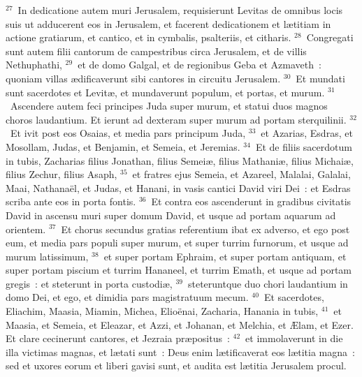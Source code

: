${}^{27}$~In dedicatione autem muri Jerusalem, requisierunt Levitas de omnibus locis suis ut adducerent eos in Jerusalem, et facerent dedicationem et l\ae titiam in actione gratiarum, et cantico, et in cymbalis, psalteriis, et citharis.
${}^{28}$~Congregati sunt autem filii cantorum de campestribus circa Jerusalem, et de villis Nethuphathi,
${}^{29}$~et de domo Galgal, et de regionibus Geba et Azmaveth~: quoniam villas \ae dificaverunt sibi cantores in circuitu Jerusalem.
${}^{30}$~Et mundati sunt sacerdotes et Levit\ae , et mundaverunt populum, et portas, et murum.
${}^{31}$~Ascendere autem feci principes Juda super murum, et statui duos magnos choros laudantium. Et ierunt ad dexteram super murum ad portam sterquilinii.
${}^{32}$~Et ivit post eos Osaias, et media pars principum Juda,
${}^{33}$~et Azarias, Esdras, et Mosollam, Judas, et Benjamin, et Semeia, et Jeremias.
${}^{34}$~Et de filiis sacerdotum in tubis, Zacharias filius Jonathan, filius Semei\ae , filius Mathani\ae , filius Michai\ae , filius Zechur, filius Asaph,
${}^{35}$~et fratres ejus Semeia, et Azareel, Malalai, Galalai, Maai, Nathana\"el, et Judas, et Hanani, in vasis cantici David viri Dei~: et Esdras scriba ante eos in porta fontis.
${}^{36}$~Et contra eos ascenderunt in gradibus civitatis David in ascensu muri super domum David, et usque ad portam aquarum ad orientem.
${}^{37}$~Et chorus secundus gratias referentium ibat ex adverso, et ego post eum, et media pars populi super murum, et super turrim furnorum, et usque ad murum latissimum,
${}^{38}$~et super portam Ephraim, et super portam antiquam, et super portam piscium et turrim Hananeel, et turrim Emath, et usque ad portam gregis~: et steterunt in porta custodi\ae ,
${}^{39}$~steteruntque duo chori laudantium in domo Dei, et ego, et dimidia pars magistratuum mecum.
${}^{40}$~Et sacerdotes, Eliachim, Maasia, Miamin, Michea, Elio\"enai, Zacharia, Hanania in tubis,
${}^{41}$~et Maasia, et Semeia, et Eleazar, et Azzi, et Johanan, et Melchia, et \AE lam, et Ezer. Et clare cecinerunt cantores, et Jezraia pr\ae positus~:
${}^{42}$~et immolaverunt in die illa victimas magnas, et l\ae tati sunt~: Deus enim l\ae tificaverat eos l\ae titia magna~: sed et uxores eorum et liberi gavisi sunt, et audita est l\ae titia Jerusalem procul.


